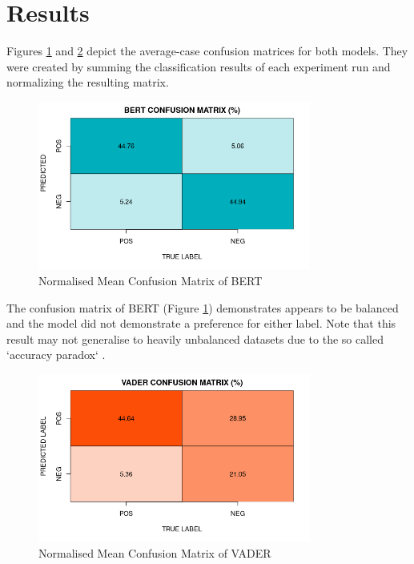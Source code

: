 \documentclass{csfourzero}
\begin{document}
\section{Results}
\label{sec:results}

\par
Figures \ref{fig:bertcmat} and \ref{fig:vadercmat} depict the average-case confusion matrices for both models. They were created by summing the classification results of each experiment run and normalizing the resulting matrix. 
\par
\begin{figure}[H]
    \centering
    \includegraphics[width=0.8\textwidth]{img/bert_cmat_plot.png}
    \caption{Normalised Mean Confusion Matrix of BERT}
    \label{fig:bertcmat}
\end{figure}
\par

The confusion matrix of BERT (Figure \ref{fig:bertcmat}) demonstrates appears to be balanced and the model did not demonstrate a preference for either label. Note that this result may not generalise to heavily unbalanced datasets due to the so called `accuracy paradox` \cite{ACCURACYPARADOX}.
\par
\begin{figure}[H]
    \centering
    \includegraphics[width=0.8\textwidth]{img/vader_cmat_plot.png}
    \caption{Normalised Mean Confusion Matrix of VADER}
    \label{fig:vadercmat}
\end{figure}
\end{document}
